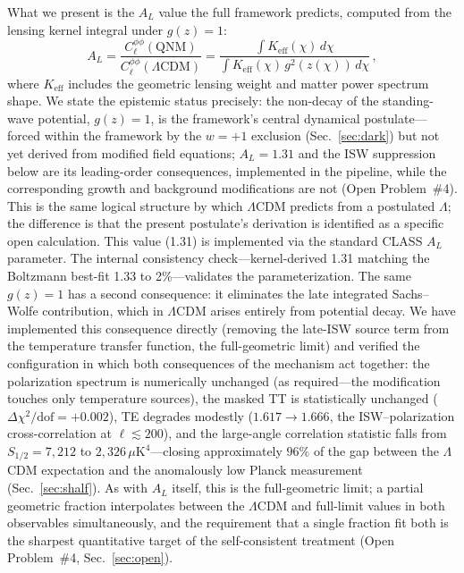 \documentclass[aps,prd,twocolumn,superscriptaddress,showpacs,preprintnumbers,amsmath,amssymb,nofootinbib]{revtex4-2}
\newcommand{\lcdm}{$\Lambda$CDM}
\begin{document}
What we present is the $A_L$ value the full framework predicts, computed from the lensing kernel integral under $g(z) = 1$:
\begin{equation}
\label{eq:al}
A_L = \frac{C_\ell^{\phi\phi}(\mathrm{QNM})}{C_\ell^{\phi\phi}(\Lambda\mathrm{CDM})} = \frac{\int K_\mathrm{eff}(\chi)\,d\chi}{\int K_\mathrm{eff}(\chi)\,g^2(z(\chi))\,d\chi}\,,
\end{equation}
where $K_\mathrm{eff}$ includes the geometric lensing weight and matter power spectrum shape. We state the epistemic status precisely: the non-decay of the standing-wave potential, $g(z) = 1$, is the framework's central dynamical postulate---forced within the framework by the $w = +1$ exclusion (Sec.~\ref{sec:dark}) but not yet derived from modified field equations; $A_L = 1.31$ and the ISW suppression below are its leading-order consequences, implemented in the pipeline, while the corresponding growth and background modifications are not (Open Problem~\#4). This is the same logical structure by which \lcdm{} predicts from a postulated $\Lambda$; the difference is that the present postulate's derivation is identified as a specific open calculation. This value (1.31) is implemented via the standard CLASS $A_L$ parameter. The internal consistency check---kernel-derived 1.31 matching the Boltzmann best-fit 1.33 to 2\%---validates the parameterization. The same $g(z) = 1$ has a second consequence: it eliminates the late integrated Sachs--Wolfe contribution, which in \lcdm{} arises entirely from potential decay. We have implemented this consequence directly (removing the late-ISW source term from the temperature transfer function, the full-geometric limit) and verified the configuration in which both consequences of the mechanism act together: the polarization spectrum is numerically unchanged (as required---the modification touches only temperature sources), the masked TT is statistically unchanged ($\Delta\chi^2/\mathrm{dof} = +0.002$), TE degrades modestly ($1.617 \to 1.666$, the ISW--polarization cross-correlation at $\ell \lesssim 200$), and the large-angle correlation statistic falls from $S_{1/2} = 7{,}212$ to $2{,}326\,\mu\mathrm{K}^4$---closing approximately $96\%$ of the gap between the \lcdm{} expectation and the anomalously low Planck measurement (Sec.~\ref{sec:shalf}). As with $A_L$ itself, this is the full-geometric limit; a partial geometric fraction interpolates between the \lcdm{} and full-limit values in both observables simultaneously, and the requirement that a single fraction fit both is the sharpest quantitative target of the self-consistent treatment (Open Problem~\#4, Sec.~\ref{sec:open}).
\end{document}

